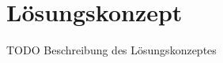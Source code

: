 \section{Lösungskonzept}
TODO Beschreibung des Lösungskonzeptes


\newpage

\newpage

\newpage

\newpage

\newpage

\newpage

\newpage

\newpage

\newpage